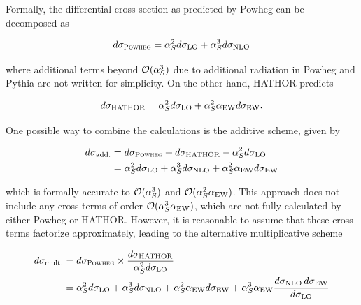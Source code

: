 Formally, the differential cross section as predicted by Powheg can be decomposed as

\begin{equation}
    d \sigma_{\textsc{Powheg}} = \alpha_S^2 d \sigma_{\mathrm{LO}} + \alpha_S^3 d \sigma_{\mathrm{NLO}}
\end{equation}

\noindent where additional terms beyond $\mathcal{O}(\alpha_S^3)$ due to additional radiation in Powheg and Pythia are not written for simplicity. On the other hand, HATHOR predicts

\begin{equation}
    d \sigma_{\mathrm{HATHOR}} = \alpha_S^2 d \sigma_{\mathrm{LO}} + \alpha_S^2 \alpha_{\mathrm{EW}} d \sigma_{\mathrm{EW}}.
\end{equation}

One possible way to combine the calculations is the additive scheme, given by


\begin{equation}
\begin{split}
\label{eq:ah:ewadd}
    d \sigma_{\mathrm{add.}} &= d \sigma_{\textsc{Powheg}} + d \sigma_{\mathrm{HATHOR}} - \alpha_S^2 d \sigma_{\mathrm{LO}} \\
    &= \alpha_S^2 d \sigma_{\mathrm{LO}} + \alpha_S^3 d \sigma_{\mathrm{NLO}} + \alpha_S^2 \alpha_{\mathrm{EW}} d \sigma_{\mathrm{EW}}
\end{split}
\end{equation}

\noindent which is formally accurate to $\mathcal{O}(\alpha_S^3)$ and $\mathcal{O}(\alpha_S^2 \alpha_{\mathrm{EW}})$. This approach does not include any cross terms of order $\mathcal{O}(\alpha_S^3 \alpha_{\mathrm{EW}})$, which are not fully calculated by either Powheg or HATHOR. However, it is reasonable to assume that these cross terms factorize approximately, leading to the alternative multiplicative scheme~\cite{Kuhn:2013zoa}

\begin{equation}
\begin{split}
\label{eq:ah:ewmult}
    d \sigma_{\mathrm{mult.}} &= d \sigma_{\textsc{Powheg}} \times \frac{d \sigma_{\mathrm{HATHOR}}} {\alpha_S^2 d \sigma_{\mathrm{LO}}} \\
    &= \alpha_S^2 d \sigma_{\mathrm{LO}} + \alpha_S^3 d \sigma_{\mathrm{NLO}} + \alpha_S^2 \alpha_{\mathrm{EW}} d \sigma_{\mathrm{EW}} + \alpha_S^3 \alpha_{\mathrm{EW}} \frac {d \sigma_{\mathrm{NLO}} \, d \sigma_{\mathrm{EW}}}{d \sigma_{\mathrm{LO}}}
\end{split}
\end{equation}

